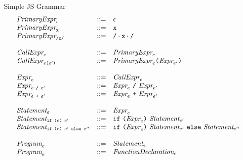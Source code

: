 \documentclass[preprint,10pt]{sigplanconf}
\begin{document}
\begin{displayfigure*}{\label{fig:grammar}Simple JS Grammar}
\[
\begin{array}{lcl}
  \textit{PrimaryExpr}_{\epsilon} &::=& \epsilon \\
  \textit{PrimaryExpr}_{\texttt{x}} &::=& \texttt{x} \\
  \textit{PrimaryExpr}_{\texttt{/x/}} &::=& \texttt{/} \cdot \texttt{x} \cdot \texttt{/} \\
  \\
  \textit{CallExpr}_{e} &::=& \textit{PrimaryExpr}_{e} \\
  \textit{CallExpr}_{e \texttt{(}e'\texttt{)}} 
  &::=& 
  \textit{PrimaryExpr}_{e} \texttt{(}
    \textit{Expr}_{e'}
  \texttt{)} \\
  \\
  \textit{Expr}_{e} &::=& \textit{CallExpr}_{e} \\
  \textit{Expr}_{e ~\texttt{/}~ e'}
  &::=&
  \textit{Expr}_{e} ~\texttt{/}~ \textit{Expr}_{e'} \\
  \textit{Expr}_{e ~\texttt{+}~ e'}
  &::=&
  \textit{Expr}_{e} ~\texttt{+}~ \textit{Expr}_{e'} \\
  \\
  \textit{Statement}_{e} &::=& \textit{Expr}_{e} \\
  \textit{Statement}_{\texttt{if}~\texttt{(}e\texttt{)}~e'} 
  &::=& 
  \texttt{if}~\texttt{(}
    \textit{Expr}_{e}  
  \texttt{)}
    ~\textit{Statement}_{e'} 
  \\
  \textit{Statement}_{\texttt{if}~\texttt{(}e\texttt{)}~e'~\texttt{else}~e''} 
  &::=& 
  \texttt{if}~\texttt{(}
    \textit{Expr}_{e}
  \texttt{)}
    ~\textit{Statement}_{e'}
  ~\texttt{else}
    ~\textit{Statement}_{e''}  
  \\
  \\
  \textit{Program}_{e} &::=& \textit{Statement}_{e} \\
  \textit{Program}_{e} &::=& \textit{FunctionDeclaration}_{e}

\end{array}
\]  
\end{displayfigure*}
\end{document}
